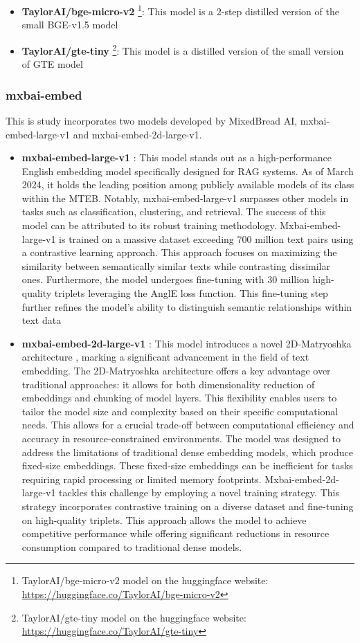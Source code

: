 \begin{itemize}
  \item \textbf{TaylorAI/bge-micro-v2} \footnote{TaylorAI/bge-micro-v2 model on the huggingface website: \url{https://huggingface.co/TaylorAI/bge-micro-v2}}: This model is a 2-step distilled version of the small BGE-v1.5 model
  \item \textbf{TaylorAI/gte-tiny} \footnote{TaylorAI/gte-tiny model on the huggingface website: \url{https://huggingface.co/TaylorAI/gte-tiny}}: This model is a distilled version of the small version of GTE model
\end{itemize}

\subsubsection{mxbai-embed}
This is study incorporates two models developed by MixedBread AI, mxbai-embed-large-v1 and mxbai-embed-2d-large-v1. 
\begin{itemize}
  \item \textbf{mxbai-embed-large-v1} \cite{emb2024mxbai}: This model stands out as a high-performance English embedding model specifically designed for \ac{RAG} systems.  As of March 2024, it holds the leading position among publicly available models of its class within the \ac{MTEB}. Notably, mxbai-embed-large-v1 surpasses other models in tasks such as classification, clustering, and retrieval. The success of this model can be attributed to its robust training methodology. Mxbai-embed-large-v1 is trained on a massive dataset exceeding 700 million text pairs using a contrastive learning approach. This approach focuses on maximizing the similarity between semantically similar texts while contrasting dissimilar ones. Furthermore, the model undergoes fine-tuning with 30 million high-quality triplets leveraging the AnglE loss function. This fine-tuning step further refines the model's ability to distinguish semantic relationships within text data
  \item \textbf{mxbai-embed-2d-large-v1} \cite{emb2024mxbai2d}: This model introduces a novel 2D-Matryoshka architecture \cite{li20242d}, marking a significant advancement in the field of text embedding. The 2D-Matryoshka architecture offers a key advantage over traditional approaches: it allows for both dimensionality reduction of embeddings and chunking of model layers. This  flexibility enables users to tailor the model size and complexity based on their specific computational needs. This allows for a crucial trade-off between computational efficiency and accuracy in resource-constrained environments. The model was designed to address the limitations of traditional dense embedding models, which produce fixed-size embeddings. These fixed-size embeddings can be inefficient for tasks requiring rapid processing or limited memory footprints. Mxbai-embed-2d-large-v1 tackles this challenge by employing a novel training strategy. This strategy incorporates contrastive training on a diverse dataset and fine-tuning on high-quality triplets. This approach allows the model to achieve competitive performance while offering significant reductions in resource consumption compared to traditional dense models.
\end{itemize}


